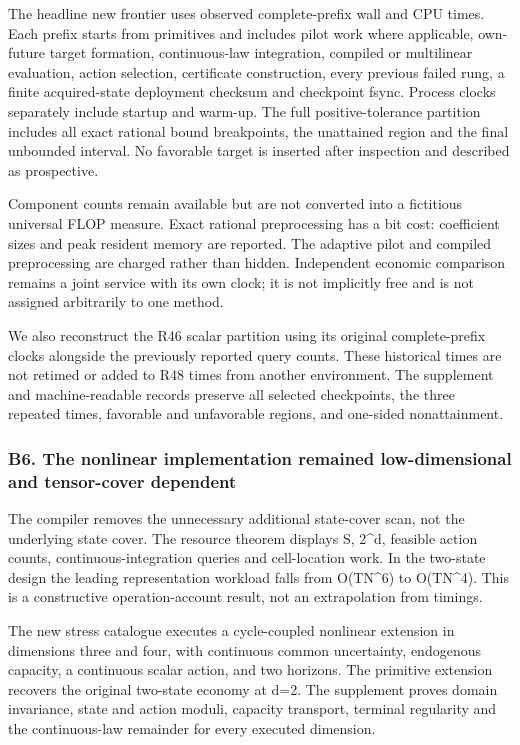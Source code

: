 \documentclass[ecta,nameyear,draft]{econsocart}
\begin{document}
The headline new frontier uses observed complete-prefix wall and CPU
times. Each prefix starts from primitives and includes pilot work where
applicable, own-future target formation, continuous-law integration,
compiled or multilinear evaluation, action selection, certificate
construction, every previous failed rung, a finite acquired-state
deployment checksum and checkpoint fsync. Process clocks separately
include startup and warm-up. The full positive-tolerance partition
includes all exact rational bound breakpoints, the unattained region and
the final unbounded interval. No favorable target is inserted after
inspection and described as prospective.

Component counts remain available but are not converted into a
fictitious universal FLOP measure. Exact rational preprocessing has a
bit cost: coefficient sizes and peak resident memory are reported. The
adaptive pilot and compiled preprocessing are charged rather than
hidden. Independent economic comparison remains a joint service with its
own clock; it is not implicitly free and is not assigned arbitrarily to
one method.

We also reconstruct the R46 scalar partition using its original
complete-prefix clocks alongside the previously reported query counts.
These historical times are not retimed or added to R48 times from
another environment. The supplement and machine-readable records
preserve all selected checkpoints, the three repeated times, favorable
and unfavorable regions, and one-sided nonattainment.

\hypertarget{b6-the-nonlinear-implementation-remained-low-dimensional-and-tensor-cover-dependent}{%
\subsubsection{B6. The nonlinear implementation remained low-dimensional
and tensor-cover
dependent}\label{b6-the-nonlinear-implementation-remained-low-dimensional-and-tensor-cover-dependent}}

The compiler removes the unnecessary additional state-cover scan, not
the underlying state cover. The resource theorem displays S, 2\^{}d,
feasible action counts, continuous-integration queries and cell-location
work. In the two-state design the leading representation workload falls
from O(TN\^{}6) to O(TN\^{}4). This is a constructive operation-account
result, not an extrapolation from timings.

The new stress catalogue executes a cycle-coupled nonlinear extension in
dimensions three and four, with continuous common uncertainty,
endogenous capacity, a continuous scalar action, and two horizons. The
primitive extension recovers the original two-state economy at d=2. The
supplement proves domain invariance, state and action moduli, capacity
transport, terminal regularity and the continuous-law remainder for
every executed dimension.
\end{document}
